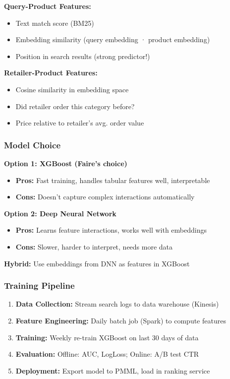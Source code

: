 \documentclass[11pt,letterpaper]{article}
\begin{document}
\textbf{Query-Product Features:}
\begin{itemize}
    \item Text match score (BM25)
    \item Embedding similarity (query embedding · product embedding)
    \item Position in search results (strong predictor!)
\end{itemize}

\textbf{Retailer-Product Features:}
\begin{itemize}
    \item Cosine similarity in embedding space
    \item Did retailer order this category before?
    \item Price relative to retailer's avg. order value
\end{itemize}

\subsubsection{Model Choice}

\textbf{Option 1: XGBoost (Faire's choice)}
\begin{itemize}
    \item \textbf{Pros:} Fast training, handles tabular features well, interpretable
    \item \textbf{Cons:} Doesn't capture complex interactions automatically
\end{itemize}

\textbf{Option 2: Deep Neural Network}
\begin{itemize}
    \item \textbf{Pros:} Learns feature interactions, works well with embeddings
    \item \textbf{Cons:} Slower, harder to interpret, needs more data
\end{itemize}

\textbf{Hybrid:} Use embeddings from DNN as features in XGBoost

\subsubsection{Training Pipeline}

\begin{enumerate}
    \item \textbf{Data Collection:} Stream search logs to data warehouse (Kinesis)
    \item \textbf{Feature Engineering:} Daily batch job (Spark) to compute features
    \item \textbf{Training:} Weekly re-train XGBoost on last 30 days of data
    \item \textbf{Evaluation:} Offline: AUC, LogLoss; Online: A/B test CTR
    \item \textbf{Deployment:} Export model to PMML, load in ranking service
\end{enumerate}
\end{document}
